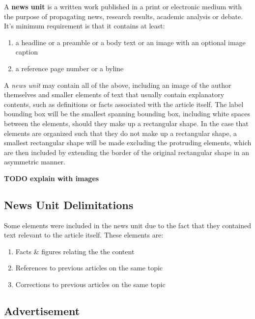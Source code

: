 \documentclass[english, bibtex]{kththesis}
\begin{document}
\begin{defn}
\label{newsunit}
A \textbf{news unit} is a written work published in a print or electronic medium with the purpose of propagating news, research results, academic analysis or debate. It’s minimum requirement is that it contains at least:

\begin{enumerate}
\item a headline or a preamble or a body text or an image with an optional image caption
\item a reference page number or a byline
\end{enumerate}
\end{defn}

A \textit{news unit} may contain all of the above, including an image of the author themselves and smaller elements of text that usually contain explanatory contents, such as definitions or facts associated with the article itself. The label bounding box will be the smallest spanning bounding box, including white spaces between the elements, should they make up a rectangular shape. In the case that elements are organized such that they do not make up a rectangular shape, a smallest rectangular shape will be made excluding the protruding elements, which are then included by extending the border of the original rectangular shape in an asymmetric manner.

\textbf{TODO explain with images}

\subsection{News Unit Delimitations}

Some elements were included in the news unit due to the fact that they contained text relevant to the article itself. These elements are:

\begin{enumerate}
\item Facts \& figures relating the the content
\item References to previous articles on the same topic
\item Corrections to previous articles on the same topic
\end{enumerate}

\subsection{Advertisement}
\end{document}
